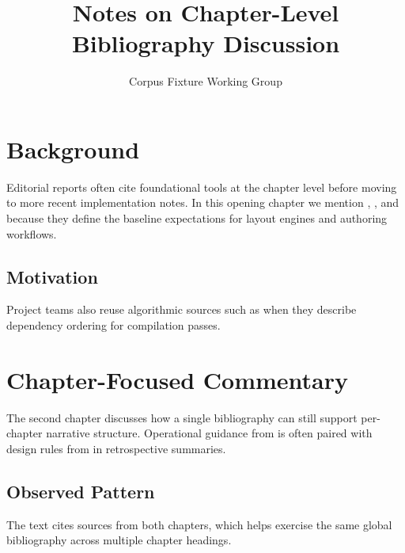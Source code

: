 \documentclass{book}
\begin{document}
\frontmatter
\title{Notes on Chapter-Level Bibliography Discussion}
\author{Corpus Fixture Working Group}
\date{}
\maketitle
\tableofcontents

\mainmatter
\chapter{Background}
Editorial reports often cite foundational tools at the chapter level before
moving to more recent implementation notes. In this opening chapter we mention
\cite{knuth84}, \cite{lamport94}, and \cite{mittelbach04} because they define the
baseline expectations for layout engines and authoring workflows.

\section{Motivation}
Project teams also reuse algorithmic sources such as \cite{tarjan72} when they
describe dependency ordering for compilation passes.

\chapter{Chapter-Focused Commentary}
The second chapter discusses how a single bibliography can still support
per-chapter narrative structure. Operational guidance from \cite{brooks75} is
often paired with design rules from \cite{hoare69} in retrospective summaries.

\section{Observed Pattern}
The text cites sources from both chapters, which helps exercise the same global
bibliography across multiple chapter headings.


\end{document}
